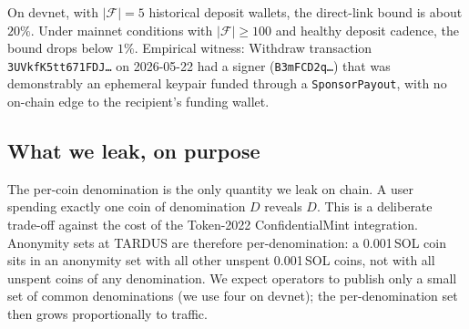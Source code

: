 On devnet, with $|\mathcal{F}| = 5$ historical deposit wallets, the direct-link bound is about $20\%$. Under mainnet conditions with $|\mathcal{F}| \geq 100$ and healthy deposit cadence, the bound drops below $1\%$. Empirical witness: Withdraw transaction \texttt{3UVkfK5tt671FDJ\ldots} on 2026-05-22 had a signer (\texttt{B3mFCD2q\ldots}) that was demonstrably an ephemeral keypair funded through a \texttt{SponsorPayout}, with no on-chain edge to the recipient's funding wallet.

\subsection{What we leak, on purpose}

The per-coin denomination is the only quantity we leak on chain. A user spending exactly one coin of denomination $D$ reveals $D$. This is a deliberate trade-off against the cost of the Token-2022 ConfidentialMint integration. Anonymity sets at TARDUS are therefore per-denomination: a 0.001\,SOL coin sits in an anonymity set with all other unspent 0.001\,SOL coins, not with all unspent coins of any denomination. We expect operators to publish only a small set of common denominations (we use four on devnet); the per-denomination set then grows proportionally to traffic.
